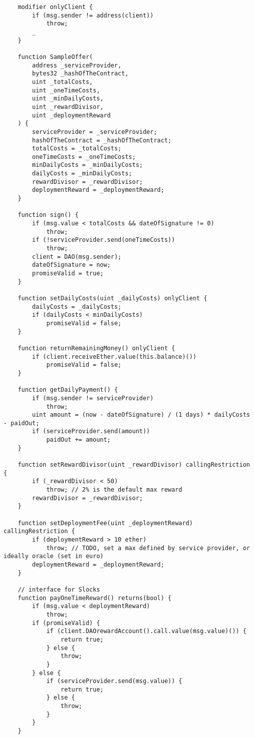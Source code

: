 \documentclass[9pt,oneside]{amsart}
\begin{document}
\begin{appendix}
\begin{verbatim}
    modifier onlyClient {
        if (msg.sender != address(client))
            throw;
        _
    }

    function SampleOffer(
        address _serviceProvider,
        bytes32 _hashOfTheContract,
        uint _totalCosts,
        uint _oneTimeCosts,
        uint _minDailyCosts,
        uint _rewardDivisor,
        uint _deploymentReward
    ) {
        serviceProvider = _serviceProvider;
        hashOfTheContract = _hashOfTheContract;
        totalCosts = _totalCosts;
        oneTimeCosts = _oneTimeCosts;
        minDailyCosts = _minDailyCosts;
        dailyCosts = _minDailyCosts;
        rewardDivisor = _rewardDivisor;
        deploymentReward = _deploymentReward;
    }

    function sign() {
        if (msg.value < totalCosts && dateOfSignature != 0)
            throw;
        if (!serviceProvider.send(oneTimeCosts))
            throw;
        client = DAO(msg.sender);
        dateOfSignature = now;
        promiseValid = true;
    }

    function setDailyCosts(uint _dailyCosts) onlyClient {
        dailyCosts = _dailyCosts;
        if (dailyCosts < minDailyCosts)
            promiseValid = false;
    }

    function returnRemainingMoney() onlyClient {
        if (client.receiveEther.value(this.balance)())
            promiseValid = false;
    }

    function getDailyPayment() {
        if (msg.sender != serviceProvider)
            throw;
        uint amount = (now - dateOfSignature) / (1 days) * dailyCosts - paidOut;
        if (serviceProvider.send(amount))
            paidOut += amount;
    }

    function setRewardDivisor(uint _rewardDivisor) callingRestriction {
        if (_rewardDivisor < 50)
            throw; // 2% is the default max reward
        rewardDivisor = _rewardDivisor;
    }

    function setDeploymentFee(uint _deploymentReward) callingRestriction {
        if (deploymentReward > 10 ether)
            throw; // TODO, set a max defined by service provider, or ideally oracle (set in euro)
        deploymentReward = _deploymentReward;
    }

    // interface for Slocks
    function payOneTimeReward() returns(bool) {
        if (msg.value < deploymentReward)
            throw;
        if (promiseValid) {
            if (client.DAOrewardAccount().call.value(msg.value)()) {
                return true;
            } else {
                throw;
            }
        } else {
            if (serviceProvider.send(msg.value)) {
                return true;
            } else {
                throw;
            }
        }
    }


\end{verbatim}
\end{appendix}
\end{document}

